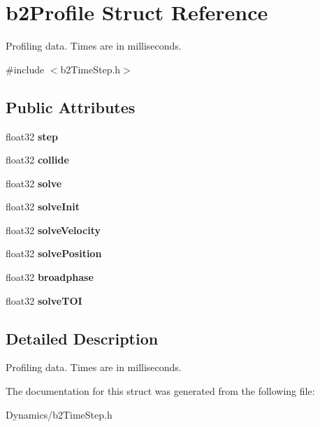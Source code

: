 \hypertarget{structb2Profile}{}\section{b2\+Profile Struct Reference}
\label{structb2Profile}


Profiling data. Times are in milliseconds.  




{\ttfamily \#include $<$b2\+Time\+Step.\+h$>$}

\subsection*{Public Attributes}
\begin{DoxyCompactItemize}
\item 
\mbox{\label{structb2Profile_a5b93de1d56902224868beacc478b9863}} 
float32 {\bfseries step}
\item 
\mbox{\label{structb2Profile_af827d9e54f7a4e94d0a023e18466b960}} 
float32 {\bfseries collide}
\item 
\mbox{\label{structb2Profile_afbefc05f05ec8bfd6cb2011929688a0b}} 
float32 {\bfseries solve}
\item 
\mbox{\label{structb2Profile_a010110900c27ccc88cd5e23b0e12e96e}} 
float32 {\bfseries solve\+Init}
\item 
\mbox{\label{structb2Profile_ae4d29a19b38de81621bccdbf75595233}} 
float32 {\bfseries solve\+Velocity}
\item 
\mbox{\label{structb2Profile_a78e22d104226863492ebab9ea30a9ed9}} 
float32 {\bfseries solve\+Position}
\item 
\mbox{\label{structb2Profile_a6bd556e43a6fa3853adad9fd71e56b44}} 
float32 {\bfseries broadphase}
\item 
\mbox{\label{structb2Profile_a74e8ea0c6ca39250d639ec94b69a803e}} 
float32 {\bfseries solve\+T\+OI}
\end{DoxyCompactItemize}


\subsection{Detailed Description}
Profiling data. Times are in milliseconds. 

The documentation for this struct was generated from the following file\+:\begin{DoxyCompactItemize}
\item 
Dynamics/b2\+Time\+Step.\+h\end{DoxyCompactItemize}

